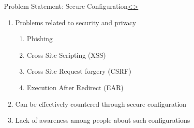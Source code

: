 \documentclass[12pt]{extarticle}
\newenvironment{instructionblock}{\Large\bgroup}{\egroup}
\begin{document}
	
	
	\pagebreak
	\begin{slide}{Problem Statement: Secure Configuration}{\hyperref[slide 4]{\textless}\hyperref[slide 6]{\textgreater}}
		\begin{instructionblock}
			\begin{enumerate}
				\item {Problems related to security and privacy }
				\begin{enumerate}
					\item Phishing
					\item Cross Site Scripting (XSS)
					\item Cross Site Request forgery (CSRF)
					\item Execution After Redirect (EAR)
				\end{enumerate}
				\item {Can be effectively countered through secure configuration}
				\item {Lack of awareness among people about such configurations}
			\end{enumerate}
		\end{instructionblock}
	\end{slide}
	\vfill
	
\end{document}
